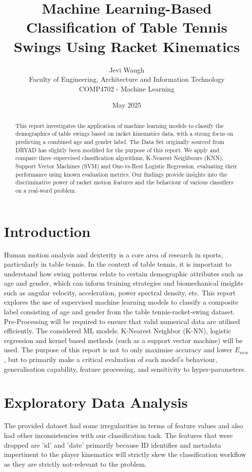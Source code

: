 \documentclass[10pt,twocolumn]{article}
\title{\textbf{Machine Learning-Based Classification of Table Tennis Swings Using Racket Kinematics}}
\author{Jevi Waugh \\
Faculty of Engineering, Architecture and Information Technology \\
COMP4702 - Machine Learning}
\date{May 2025}
\begin{document}
\maketitle
\begin{abstract}
This report investigates the application of machine learning models to classify the demographics of table swings based on racket kinematics data, with a strong focus on predicting a combined age and gender label. The Data Set originally sourced from DRYAD has slightly been modified for the purpose of this report. We apply and compare three supervised classification algorithms, K-Nearest Neighbours (KNN), Support Vector Machines (SVM) and One-vs-Rest Logistic Regression, evaluating their performance using known evaluation metrics. Our findings provide insights into the discriminative power of racket motion features and the behaviour of various classifiers on a real-word problem. 
\end{abstract}
%
\section{Introduction}
Human motion analysis and dexterity is a core area of research in sports, particularly in table tennis. In the context of table tennis, it is important to understand how swing patterns relate to certain demographic attributes such as age and gender, which can inform training strategies and biomechanical insights such as angular velocity, acceleration, power spectral density, etc. This report explores the use of supervised machine learning models to classify a composite label consisting of age and gender from the table tennis-racket-swing dataset. Pre-Processing will be required to ensure that valid numerical data are utilised efficiently. The considered ML models: K-Nearest Neighbor (K-NN), logistic regression and kernel based methods (such as a support vector machine) will be used. The purpose of this report is not to only maximise accuracy and lower $E_{new}$, but to primarily make a critical evaluation of each model's behaviour, generalisation capability, feature processing, and sensitivity to hyper-parameters.

\section{Exploratory Data Analysis}
The provided dataset had some irregularities in terms of feature values and also had other inconsistencies with our classification task. The features that were dropped are 'id' and 'date' primarily because ID identifies and metadata impertinent to the player kinematics will strictly skew the classification workflow as they are strictly not-relevant to the problem.
\end{document}

